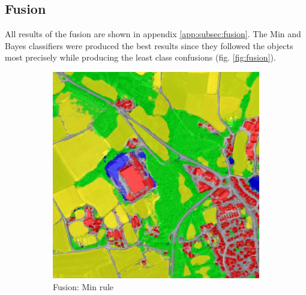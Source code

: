 \documentclass[10pt]{article}
\begin{document}
\subsection{Fusion}
All results of the fusion are shown in appendix \ref{app:subsec:fusion}. The Min and Bayes classifiers were produced the best results since they followed the objects most precisely while producing the least class confusions (fig. \ref{fig:fusion}).

\begin{figure}[H]
    \centering 
    \begin{subfigure}{0.49\textwidth}
        \centering
        \includegraphics[width=\textwidth]{T41000_30000_classif_Fusion_Min_weighted}
        \caption{Fusion: Min rule}
        \label{fig:fusion_min}
    \end{subfigure}
    \begin{subfigure}{0.49\textwidth}
        \centering

\end{subfigure}
\end{figure}
\end{document}
